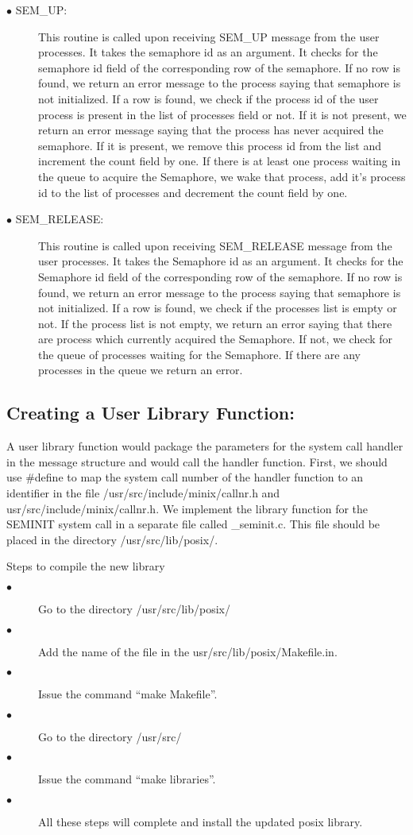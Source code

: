 \documentclass[a4paper,11pt,twocolumn]{article}
\begin{document}
\begin{description}
\item[$\bullet$ SEM\_UP:] This routine is called upon receiving SEM\_UP message from the user processes. It takes the semaphore id as an argument. It checks for the semaphore id field of the corresponding row of the semaphore. If no row is found, we return an error message to the process saying that semaphore is not initialized. If a row is found, we check if the process id of the user process is present in the list of processes field or not. If it is not present, we return an error message saying that the process has never acquired the semaphore. If it is present, we remove this process id from the list and increment the count field by one. If there is at least one process waiting in the queue to acquire the Semaphore, we wake that process, add it’s process id to the list of processes and decrement the count field by one. 
\item[$\bullet$ SEM\_RELEASE:] This routine is called upon receiving SEM\_RELEASE message from the user processes. It takes the Semaphore id as an argument. It checks for the Semaphore id field of the corresponding row of the semaphore. If no row is found, we return an error message to the process saying that semaphore is not initialized. If a row is found, we check if the processes list is empty or not. If the process list is not empty, we return an error saying that there are process which currently acquired the Semaphore. If not, we check for the queue of processes waiting for the Semaphore. If there are any processes in the queue we return an error.

\end{description}

\subsection{ Creating a User Library Function: }
A user library function would package the parameters for the system call handler in the message structure and would call the handler function. First, we should use \#define to map the system call number of the handler function to an identifier in the file /usr/src/include/minix/callnr.h and usr/src/include/minix/callnr.h. We implement the library function for the SEMINIT system call in a separate file called \_seminit.c. This file should be placed in the directory /usr/src/lib/posix/.

Steps to compile the new library

\begin{description}
  \item[$\bullet$ ] Go to the directory /usr/src/lib/posix/
  \item[$\bullet$ ] Add the name of the file in the usr/src/lib/posix/Makefile.in.
  \item[$\bullet$ ] Issue the command “make Makefile”.
  \item[$\bullet$ ] Go to the directory /usr/src/
  \item[$\bullet$ ] Issue the command “make libraries”.
  \item[$\bullet$ ] All these steps will complete and install the updated posix library.
\end{description}
\end{document}
